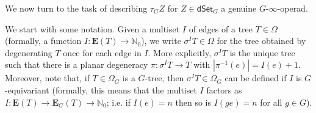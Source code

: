 \documentclass[a4paper,10pt
,draft
]{article}%
\numberwithin{equation}{section}
\numberwithin{figure}{section}
\theoremstyle{definition} %
\newcommand{\1}{\ensuremath{\mathbbm 1}}%
\begin{document}
We now turn to the task of describing
$\tau_G Z$ for $Z \in \mathsf{dSet}_G$
a genuine $G$-$\infty$-operad.

We start with some notation. 
Given a multiset $I$ of edges of a tree $T \in \Omega$
(formally, a function 
$I \colon \boldsymbol{E}(T) \to \mathbb{N}_0$),
we write $\sigma^I T \in \Omega$
for the tree obtained by degenerating $T$ once for each edge in $I$.
More explicitly, $\sigma^I T$ is the unique tree such that there is a planar degeneracy
$\pi \colon \sigma^I T \to T$
with $|\pi^{-1}(e)| = I(e) + 1$.
Moreover,
note that, if $T\in \Omega_G$ is a $G$-tree, 
then $\sigma^{I} T \in \Omega_{G}$
can be defined if $I$ is $G$-equivariant
(formally, this means that the multiset $I$ 
factors as
$I \colon \boldsymbol{E}(T) \to \boldsymbol{E}_G(T)
\to \mathbb{N}_0$;
i.e. if $I(e)=n$ then so is $I(ge)=n$ for all $g \in G$).
\end{document}
